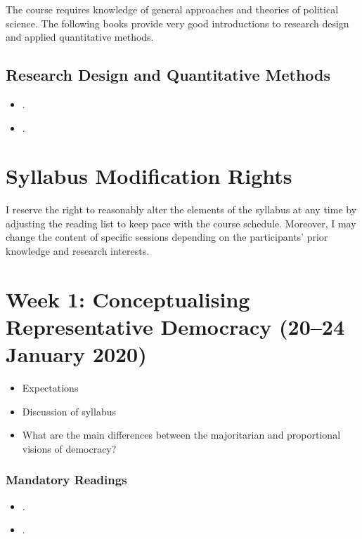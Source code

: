 \documentclass[abstract=on,parskip=full,headings=standardclasses,fontsize=11pt,paper=a4]{scrartcl}
\begin{document}
The course requires knowledge of general approaches and theories of political science. The following books provide very good introductions to research design and applied quantitative methods.

\subsection*{Research Design and Quantitative Methods}
\begin{itemize}
\item {}.
\item {}.
\end{itemize}


\section*{Syllabus Modification Rights}

I reserve the right to reasonably alter the elements of the syllabus at any time by adjusting the reading list to keep pace with the course schedule. Moreover, I may change the content of specific sessions depending on the participants' prior knowledge and research interests.



\newpage

\tableofcontents

\section{Week 1: Conceptualising Representative Democracy (20--24 January 2020)}

\begin{itemize}
\renewcommand\labelitemi{--}
\item Expectations
\item Discussion of syllabus
\item What are the main differences between the majoritarian and proportional visions of democracy?
\end{itemize}


\subsubsection*{Mandatory Readings}
\begin{itemize}
\item {}.
\item {}.
\end{itemize}
\end{document}
